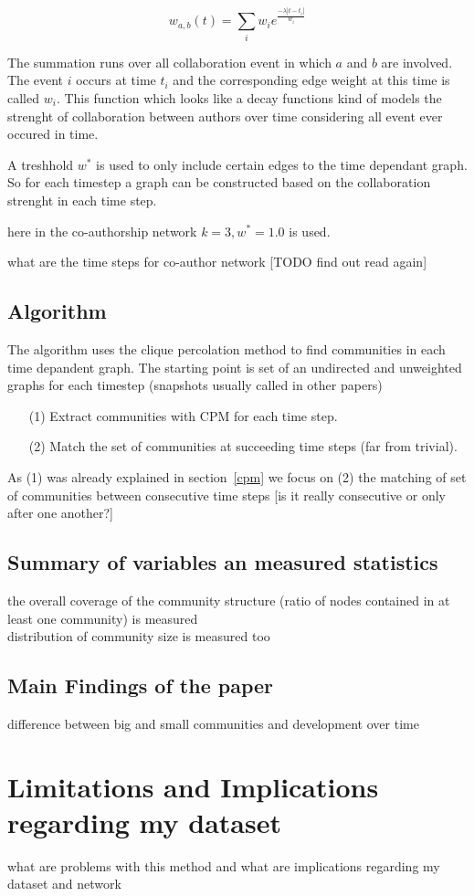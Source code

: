 \documentclass[runningheads,a4paper]{llncs}
\begin{document}
$$w_{a,b}(t)= \sum_{i}^{} w_i e^{\frac{-\lambda \left|t-t_i\right|}{w_i}}$$

The summation runs over all collaboration event in which $a$ and $b$ are involved. The event $i$ occurs at time $t_i$ and the corresponding edge weight at this time is called $w_i$. This function which looks like a decay functions kind of models the strenght of collaboration between authors over time considering all event ever occured in time.

A treshhold $w^*$ is used to only include certain edges to the time dependant graph. So for each timestep a graph can be constructed based on the collaboration strenght in each time step.

here in the co-authorship network $k=3, w^*=1.0$ is used.

what are the time steps for co-author network [TODO find out read again]

\subsection{Algorithm}
The algorithm uses the clique percolation method to find communities in each time depandent graph. The starting point is set of an undirected and unweighted  graphs for each timestep (snapshots usually called in other papers)

\begin{enumerate}
\item[(1)] Extract communities with CPM for each time step.
\item[(2)] Match the set of communities at succeeding time steps (far from trivial). 
\end{enumerate}

As (1) was already explained in section~\ref{cpm} we focus on (2) the matching of set of communities between consecutive time steps [is it really consecutive or only after one another?]


\subsection{Summary of variables an measured statistics}
the overall coverage of the community structure (ratio of nodes contained in at least one community) is measured\\
distribution of community size is measured too\\

\subsection{Main Findings of the paper}
difference between big and small communities and development over time

\section{Limitations and Implications regarding my dataset}
what are problems with this method and what are implications regarding my dataset and network

{
	
	
}
\end{document}
